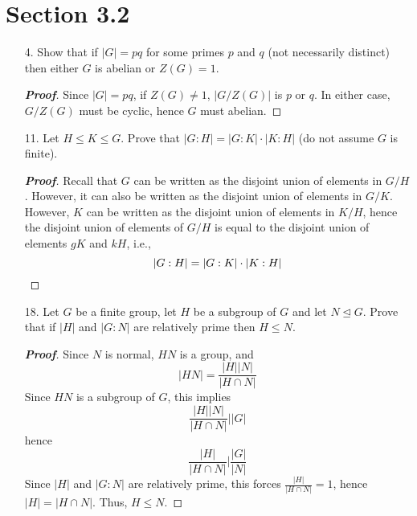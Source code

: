 \documentclass[12pt,leqno]{book}
\theoremstyle{definition}
\newenvironment{Proof}{\begin{proof}[\textnormal{\textbf{Proof}}]}{\end{proof}}
\begin{document}
\section*{Section 3.2}
\begin{enumerate}
 \item [4.] Show that if $|G|=pq$ for some primes $p$ and $q$ (not necessarily distinct) then either $G$ is abelian or $Z(G)=1$.
\begin{Proof}
 Since $|G|=pq$, if $Z(G)\not=1$, $|G/Z(G)|$ is $p$ or $q$. In either case, $G/Z(G)$ must be cyclic, hence $G$ must abelian.
\end{Proof}

 \item [11.] Let $H\leq K\leq G$. Prove that $|G:H|=|G:K|\cdot|K:H|$ (do not assume $G$ is finite).

\begin{Proof}
 Recall that $G$ can be written as the disjoint union of elements in $G/H$. However, it can also be written as the disjoint union of elements in $G/K$. However, $K$ can be written as the disjoint union of elements in $K/H$, hence the disjoint union of elements of $G/H$ is equal to the disjoint union of elements $gK$ and $kH$, i.e., \[|G:H|=|G:K|\cdot|K:H|\qedhere\]
\end{Proof}

 \item [18.] Let $G$ be a finite group, let $H$ be a subgroup of $G$ and let $N\unlhd G$. Prove that if $|H|$ and $|G:N|$ are relatively prime then $H\leq N$.

\begin{Proof}
 Since $N$ is normal, $HN$ is a group, and \[|HN|=\frac{|H||N|}{|H\cap N|}\] Since $HN$ is a subgroup of $G$, this implies \[\frac{|H||N|}{|H\cap N|}||G|\] hence \[\frac{|H|}{|H\cap N|}|\frac{|G|}{|N|}\] Since $|H|$ and $|G:N|$ are relatively prime, this forces $\frac{|H|}{|H\cap N|}=1$, hence $|H|=|H\cap N|$. Thus, $H\leq N$.
\end{Proof}

\end{enumerate}
\end{document}
